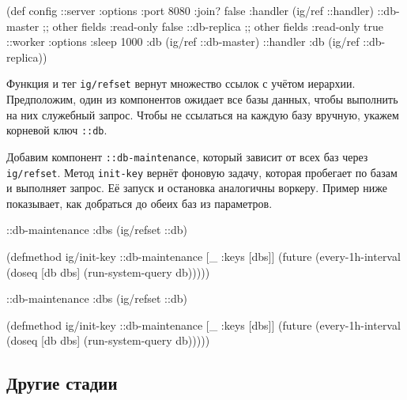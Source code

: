 \else

\begin{english}
  \begin{clojure}
(def config
  {::server {:options {:port 8080 :join? false}
             :handler (ig/ref ::handler)}
   ::db-master {;; other fields
                :read-only false}
   ::db-replica {;; other fields
                 :read-only true}
   ::worker {:options {:sleep 1000}
             :db (ig/ref ::db-master)}
   ::handler {:db (ig/ref ::db-replica)}})
  \end{clojure}
\end{english}

\fi

Функция и тег \verb|ig/refset| вернут множество ссылок с учётом
иерархии. Предположим, один из компонентов ожидает все базы данных, чтобы
выполнить на них служебный запрос. Чтобы не ссылаться на каждую базу вручную,
укажем корневой ключ \verb|::db|.

Добавим компонент \texttt{::db-main\-te\-nance}, который зависит от всех баз
через \verb|ig/refset|. Метод \verb|init-key| вернёт фоновую задачу, которая
пробегает по базам и выполняет запрос. Её запуск и остановка аналогичны
воркеру. Пример ниже показывает, как добраться до обеих баз из параметров.

\ifnarrow

\begin{english}
  \begin{clojure}
{::db-maintenance
 {:dbs (ig/refset ::db)}}

(defmethod ig/init-key ::db-maintenance
  [_ {:keys [dbs]}]
  (future
    (every-1h-interval
      (doseq [db dbs]
        (run-system-query db)))))
  \end{clojure}
\end{english}

\else

\begin{english}
  \begin{clojure}
{::db-maintenance {:dbs (ig/refset ::db)}}

(defmethod ig/init-key ::db-maintenance
  [_ {:keys [dbs]}]
  (future
    (every-1h-interval
      (doseq [db dbs]
        (run-system-query db)))))
  \end{clojure}
\end{english}

\fi

\subsection{Другие стадии}

